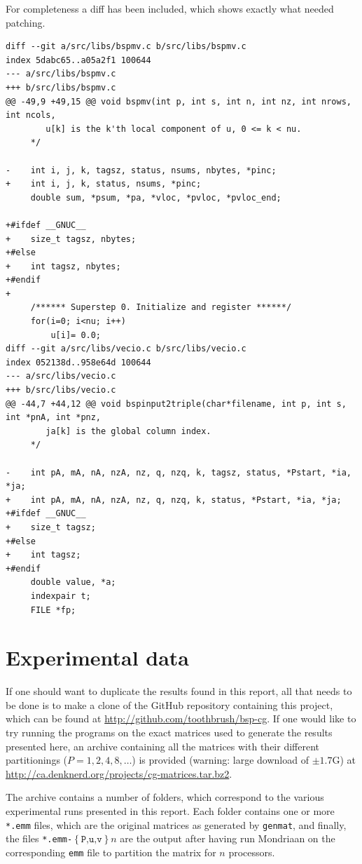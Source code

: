 \documentclass[a4paper]{article}
\begin{document}
For completeness a diff has been included, which shows exactly what needed patching.


\begin{verbatim}
diff --git a/src/libs/bspmv.c b/src/libs/bspmv.c
index 5dabc65..a05a2f1 100644
--- a/src/libs/bspmv.c
+++ b/src/libs/bspmv.c
@@ -49,9 +49,15 @@ void bspmv(int p, int s, int n, int nz, int nrows, int ncols,
        u[k] is the k'th local component of u, 0 <= k < nu.
     */
 
-    int i, j, k, tagsz, status, nsums, nbytes, *pinc;
+    int i, j, k, status, nsums, *pinc;
     double sum, *psum, *pa, *vloc, *pvloc, *pvloc_end;
 
+#ifdef __GNUC__
+    size_t tagsz, nbytes;
+#else
+    int tagsz, nbytes;
+#endif
+
     /****** Superstep 0. Initialize and register ******/
     for(i=0; i<nu; i++)
         u[i]= 0.0;
diff --git a/src/libs/vecio.c b/src/libs/vecio.c
index 052138d..958e64d 100644
--- a/src/libs/vecio.c
+++ b/src/libs/vecio.c
@@ -44,7 +44,12 @@ void bspinput2triple(char*filename, int p, int s, int *pnA, int *pnz,
        ja[k] is the global column index.
     */
 
-    int pA, mA, nA, nzA, nz, q, nzq, k, tagsz, status, *Pstart, *ia, *ja;
+    int pA, mA, nA, nzA, nz, q, nzq, k, status, *Pstart, *ia, *ja;
+#ifdef __GNUC__
+    size_t tagsz;
+#else
+    int tagsz;
+#endif
     double value, *a;
     indexpair t;
     FILE *fp;
\end{verbatim}
\clearpage

\section{Experimental data}

If one should want to duplicate the results found in this report, all that needs to be done
is to make a clone of the GitHub repository containing this project, which can be found at
\url{http://github.com/toothbrush/bsp-cg}. If one would like to try running the programs on the exact matrices
used to generate the results presented here, an archive containing all the matrices with their
different partitionings ($P=1,2,4,8, \ldots$) is provided (warning: large
download of $\pm 1.7$G) at \url{http://ca.denknerd.org/projects/cg-matrices.tar.bz2}.

The archive contains a number of folders, which correspond to the various experimental runs
presented in this report. Each folder contains one or more \texttt{*.emm} files, which are the original
matrices as generated by \texttt{genmat}, and finally, the files \texttt{*.emm-$\left\{\texttt{P,u,v}\right\}n$} are
the output after having run Mondriaan on the corresponding \texttt{emm} file to partition the matrix for $n$ processors.
\end{document}
